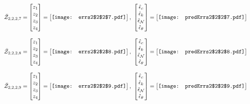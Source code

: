 \documentclass[12pt]{article}
\begin{document}
\begin{gather*}
\bar{\mathcal{Z}}_{2,2,2,7}=\begin{bmatrix}
z_1\\
z_2\\
z_3\\
z_4
 \end{bmatrix}= \begin{bmatrix}
\vcenter{\hbox{\texttt{[image: errs2\$2\$2\$7.pdf]}}}
 \end{bmatrix},\,\, \begin{bmatrix}
\hat{\epsilon}_c\\\hat{\epsilon}_k\\\hat{\epsilon}_\mathcal{N}\\\hat{\epsilon}_\theta
 \end{bmatrix}=\begin{bmatrix}
\vcenter{\hbox{\texttt{[image: predErrs2\$2\$2\$7.pdf]}}}
 \end{bmatrix}
\end{gather*}


\begin{gather*}
\bar{\mathcal{Z}}_{2,2,2,8}=\begin{bmatrix}
z_1\\
z_2\\
z_3\\
z_4
 \end{bmatrix}= \begin{bmatrix}
\vcenter{\hbox{\texttt{[image: errs2\$2\$2\$8.pdf]}}}
 \end{bmatrix},\,\, \begin{bmatrix}
\hat{\epsilon}_c\\\hat{\epsilon}_k\\\hat{\epsilon}_\mathcal{N}\\\hat{\epsilon}_\theta
 \end{bmatrix}=\begin{bmatrix}
\vcenter{\hbox{\texttt{[image: predErrs2\$2\$2\$8.pdf]}}}
 \end{bmatrix}
\end{gather*}



\begin{gather*}
\bar{\mathcal{Z}}_{2,2,2,9}=\begin{bmatrix}
z_1\\
z_2\\
z_3\\
z_4
 \end{bmatrix}= \begin{bmatrix}
\vcenter{\hbox{\texttt{[image: errs2\$2\$2\$9.pdf]}}}
 \end{bmatrix},\,\, \begin{bmatrix}
\hat{\epsilon}_c\\\hat{\epsilon}_k\\\hat{\epsilon}_\mathcal{N}\\\hat{\epsilon}_\theta
 \end{bmatrix}=\begin{bmatrix}
\vcenter{\hbox{\texttt{[image: predErrs2\$2\$2\$9.pdf]}}}
 \end{bmatrix}
\end{gather*}
\end{document}
